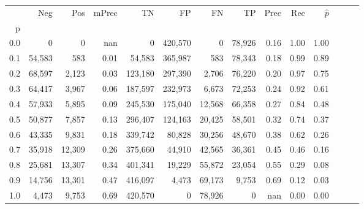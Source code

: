 \begin{tabular}{rrrrrrrrrrrrrr}
\toprule
{} &     Neg &     Pos & mPrec &       TN &       FP &      FN &      TP &  Prec &   Rec & $\hat{p}$ \\
p   &         &         &       &          &          &         &         &       &       &           \\
\midrule
0.0 &       0 &       0 &   nan &        0 &  420,570 &       0 &  78,926 &  0.16 &  1.00 &      1.00 \\
0.1 &  54,583 &     583 &  0.01 &   54,583 &  365,987 &     583 &  78,343 &  0.18 &  0.99 &      0.89 \\
0.2 &  68,597 &   2,123 &  0.03 &  123,180 &  297,390 &   2,706 &  76,220 &  0.20 &  0.97 &      0.75 \\
0.3 &  64,417 &   3,967 &  0.06 &  187,597 &  232,973 &   6,673 &  72,253 &  0.24 &  0.92 &      0.61 \\
0.4 &  57,933 &   5,895 &  0.09 &  245,530 &  175,040 &  12,568 &  66,358 &  0.27 &  0.84 &      0.48 \\
0.5 &  50,877 &   7,857 &  0.13 &  296,407 &  124,163 &  20,425 &  58,501 &  0.32 &  0.74 &      0.37 \\
0.6 &  43,335 &   9,831 &  0.18 &  339,742 &   80,828 &  30,256 &  48,670 &  0.38 &  0.62 &      0.26 \\
0.7 &  35,918 &  12,309 &  0.26 &  375,660 &   44,910 &  42,565 &  36,361 &  0.45 &  0.46 &      0.16 \\
0.8 &  25,681 &  13,307 &  0.34 &  401,341 &   19,229 &  55,872 &  23,054 &  0.55 &  0.29 &      0.08 \\
0.9 &  14,756 &  13,301 &  0.47 &  416,097 &    4,473 &  69,173 &   9,753 &  0.69 &  0.12 &      0.03 \\
1.0 &   4,473 &   9,753 &  0.69 &  420,570 &        0 &  78,926 &       0 &   nan &  0.00 &      0.00 \\
\bottomrule
\end{tabular}
